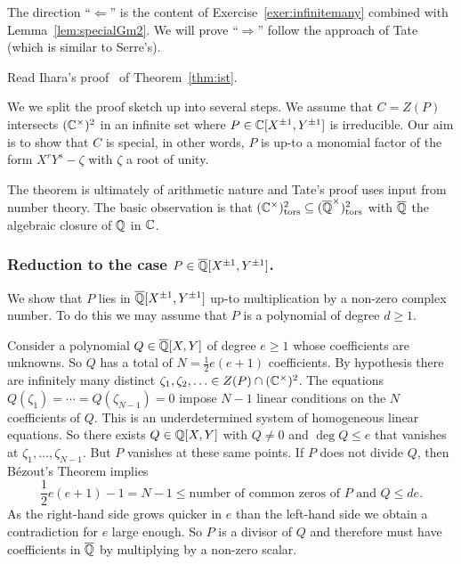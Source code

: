 The direction ``$\Longleftarrow$'' is the content of
Exercise~\ref{exer:infinitemany} combined with
Lemma~\ref{lem:specialGm2}. We will prove ``$\Longrightarrow$'' follow
the approach of Tate (which is similar to Serre's).

\begin{exercise}
  Read Ihara's proof~\cite{Lang:Division} of Theorem~\ref{thm:ist}.
\end{exercise}

We we split the proof sketch up into several steps. We assume that
$C=Z(P)$ intersects $({\mathbb{C}}^\times)^2$ in an infinite set where $P\in
{\mathbb{C}}[X^{\pm 1},Y^{\pm 1}]$ is irreducible.
Our aim is to show that $C$ is special, in other words, $P$ is up-to a
monomial factor of the form $X^rY^s-\zeta$ with $\zeta$ a root of
unity. 

The theorem is ultimately of arithmetic nature and Tate's proof uses
input from number theory. The basic observation is that
$({\mathbb{C}}^\times)^2_{\mathrm{tors}}\subseteq
({\overline{\mathbb{Q}}}^\times)^2_{\mathrm{tors}}$ with ${\overline{\mathbb{Q}}}$ the algebraic closure
of ${\mathbb{Q}}$ in ${\mathbb{C}}$.

\subsubsection{Reduction to the case $P \in {\overline{\mathbb{Q}}}[X^{\pm
    1},Y^{\pm 1}]$.}

We show that $P$ lies in ${\overline{\mathbb{Q}}}[X^{\pm 1},Y^{\pm 1}]$ up-to
multiplication by a non-zero complex number. To do this we may assume
that $P$ is a polynomial of degree $d\ge 1$.

Consider a polynomial $Q\in
{\overline{\mathbb{Q}}}[X,Y]$ of degree $e\ge 1$ whose coefficients are unknowns. So
$Q$ has a total of $N = \frac 12 e(e+1)$ coefficients. 
By hypothesis there are infinitely many distinct
$\zeta_1,\zeta_2,\ldots \in Z(P)\cap ({\mathbb{C}}^\times)^2$.
The equations $Q(\zeta_1) = \cdots = Q(\zeta_{N-1})=0$
impose $N-1$ linear conditions on the $N$ coefficients of
$Q$.
This is an underdetermined system of homogeneous linear equations. So
there exists $Q\in {\mathbb{Q}}[X,Y]$ with $Q\not=0$  and $\deg Q \le e$ that vanishes at
$\zeta_1,\ldots,\zeta_{N-1}$. But $P$ vanishes at these same points.
If $P$ does not divide $Q$, then B\'ezout's Theorem implies
\begin{equation*}
  \frac 12 e(e+1)-1=  N-1 \le \text{number of common zeros of $P$ and $Q$} \le de.
\end{equation*}
As the right-hand side grows quicker in $e$ than the left-hand side we obtain a
contradiction for $e$ large enough. So $P$ is a divisor of $Q$ and
therefore must have coefficients in ${\overline{\mathbb{Q}}}$ by multiplying by a non-zero
scalar. 

